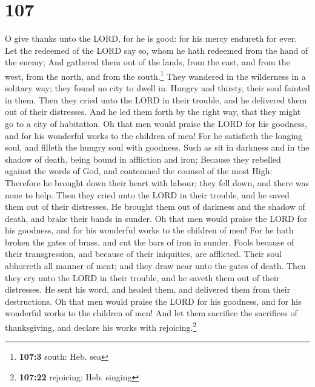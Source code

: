 \hypertarget{section-106}{%
\section{107}\label{section-106}}

 O give thanks unto the LORD, for he is good: for his
mercy endureth for ever.  Let the redeemed of the LORD say
so, whom he hath redeemed from the hand of the enemy;  And
gathered them out of the lands, from the east, and from the west, from
the north, and from the south.\footnote{\textbf{107:3} south: Heb. sea}
 They wandered in the wilderness in a solitary way; they
found no city to dwell in.  Hungry and thirsty, their soul
fainted in them.  Then they cried unto the LORD in their
trouble, and he delivered them out of their distresses. 
And he led them forth by the right way, that they might go to a city of
habitation.  Oh that men would praise the LORD for his
goodness, and for his wonderful works to the children of men!
 For he satisfieth the longing soul, and filleth the
hungry soul with goodness.  Such as sit in darkness and
in the shadow of death, being bound in affliction and iron;
 Because they rebelled against the words of God, and
contemned the counsel of the most High:  Therefore he
brought down their heart with labour; they fell down, and there was none
to help.  Then they cried unto the LORD in their trouble,
and he saved them out of their distresses.  He brought
them out of darkness and the shadow of death, and brake their bands in
sunder.  Oh that men would praise the LORD for his
goodness, and for his wonderful works to the children of men!
 For he hath broken the gates of brass, and cut the bars
of iron in sunder.  Fools because of their transgression,
and because of their iniquities, are afflicted.  Their
soul abhorreth all manner of meat; and they draw near unto the gates of
death.  Then they cry unto the LORD in their trouble, and
he saveth them out of their distresses.  He sent his
word, and healed them, and delivered them from their destructions.
 Oh that men would praise the LORD for his goodness, and
for his wonderful works to the children of men!  And let
them sacrifice the sacrifices of thanksgiving, and declare his works
with rejoicing.\footnote{\textbf{107:22} rejoicing: Heb. singing}

